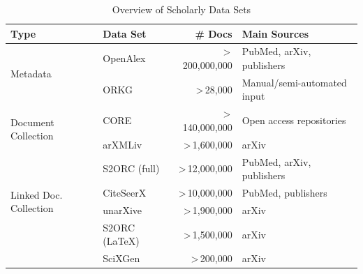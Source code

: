 \begin{table}[tb]
  \caption{Overview of Scholarly Data Sets}
  \label{tab:scholarly_data_sets}
  \centering
  \begin{small}
    \begin{threeparttable}
      \begin{tabular}{llrl}
        \toprule
        Type & Data Set       & \# Docs          & Main Sources \\
        \midrule
        \multirow{2}{*}{Metadata}
             & OpenAlex       & >\,200,000,000     & PubMed, arXiv, publishers \\
        \    & ORKG           & >\,28,000          & Manual/semi-automated input \\
        \midrule
        \multirow{2}{*}{Document Collection}
             & CORE           & >\,140,000,000     & Open access repositories \\
        \    & arXMLiv        & >\,1,600,000       & arXiv \\
        \midrule
        \multirow{4}{*}{Linked Doc. Collection}
             & S2ORC (full)   & >\,12,000,000      & PubMed, arXiv, publishers \\
             & CiteSeerX      & >\,10,000,000      & PubMed, publishers \\
        \    & unarXive       & >\,1,900,000       & arXiv \\
        \    & S2ORC (\LaTeX) & >\,1,500,000       & arXiv \\
        \    & SciXGen        & >\,200,000         & arXiv \\
        \bottomrule
      \end{tabular}
    \end{threeparttable}
  \end{small}
\end{table}


